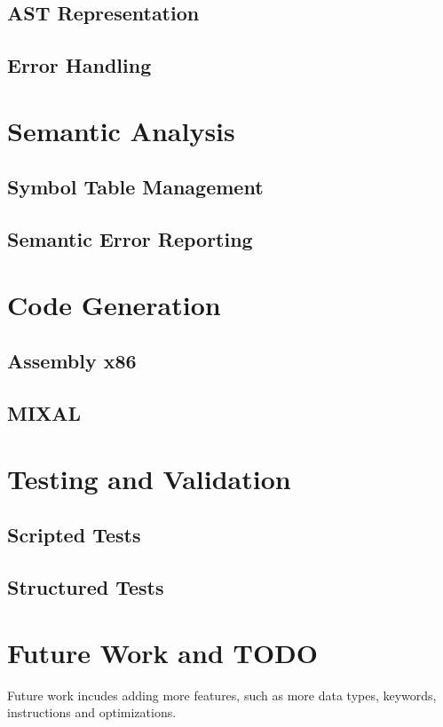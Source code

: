 \documentclass{article}
\begin{document}
    \subsection{AST Representation}
    \subsection{Error Handling}

\section{Semantic Analysis}
    \subsection{Symbol Table Management}
    \subsection{Semantic Error Reporting}

\section{Code Generation}
    \subsection{Assembly x86}
    \subsection{MIXAL}

\section{Testing and Validation}
    \subsection{Scripted Tests}
    \subsection{Structured Tests}

\appendix
\section{Future Work and TODO}
Future work incudes adding more features, such as more data types, keywords, instructions and optimizations.
\end{document}
